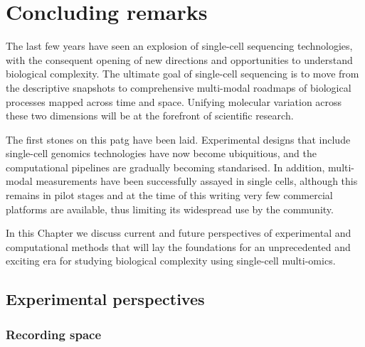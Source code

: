 \graphicspath{{Chapter5/Figs/}}

\chapter{Concluding remarks}

The last few years have seen an explosion of single-cell sequencing technologies, with the consequent opening of new directions and opportunities to understand biological complexity. The ultimate goal of single-cell sequencing is to move from the descriptive snapshots to comprehensive multi-modal roadmaps of biological processes mapped across time and space. Unifying molecular variation across these two dimensions will be at the forefront of scientific research.
 
The first stones on this patg have been laid. Experimental designs that include single-cell genomics technologies have now become ubiquitious, and the computational pipelines are gradually becoming standarised. In addition, multi-modal measurements have been successfully assayed in single cells, although this remains in pilot stages and at the time of this writing very few commercial platforms are available, thus limiting its widespread use by the community. 

In this Chapter we discuss current and future perspectives of experimental and computational methods that will lay the foundations for an unprecedented and exciting era for studying biological complexity using single-cell multi-omics.


\section{Experimental perspectives} 

\subsection{Recording space} 

